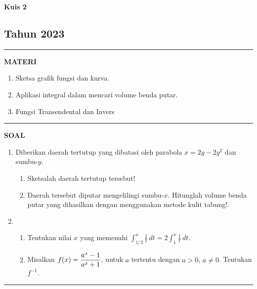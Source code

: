 \begin{flushright}
    \textbf{\Large{Kuis 2}}
    \subsection*{Tahun 2023}
\end{flushright}
\vspace{0.5cm}
\hrule height 2pt
\vspace{0.5cm}
\begin{center}
    \textbf{\large{MATERI}}
    \begin{enumerate}[leftmargin=*, label={\arabic*}.]
        \item Sketsa grafik fungsi dan kurva.
        \item Aplikasi integral dalam mencari volume benda putar.
        \item Fungsi Transendental dan Invers
    \end{enumerate}
\end{center}
\vspace{0.2cm}
\hrule height 1pt
\vspace{0.5cm}
\begin{center}
    \textbf{\large{SOAL}}
\end{center}
\begin{enumerate}[leftmargin=*, label={\arabic*}.]
\item Diberikan daerah tertutup yang dibatasi oleh parabola $x=2y-2y^{2}$ 
dan sumbu-$y$.
\begin{enumerate}[label={\alph*}.]
    \item Sketsalah daerah tertutup tersebut!
    \item Daerah tersebut diputar mengelilingi sumbu-$x$. Hitunglah volume 
    benda putar yang dihasilkan dengan menggunakan metode kulit tabung!.
\end{enumerate}
\item \begin{enumerate}[label={\alph*}.]
    \item Tentukan nilai $x$ yang memenuhi 
    $\int_{1/3}^{x}\frac{1}{t}\,dt=2\int_{1}^{x}\frac{1}{t}\,dt$.
    \item Misalkan $\displaystyle f(x)=\frac{a^{x}-1}{a^{x}+1}$, untuk $a$ tertentu dengan $a > 0$, $a\neq 0$.
    Tentukan $f^{-1}$.
\end{enumerate}
\end{enumerate}
\vspace{0.2cm}
\hrule height 1pt
\vspace{0.5cm}

